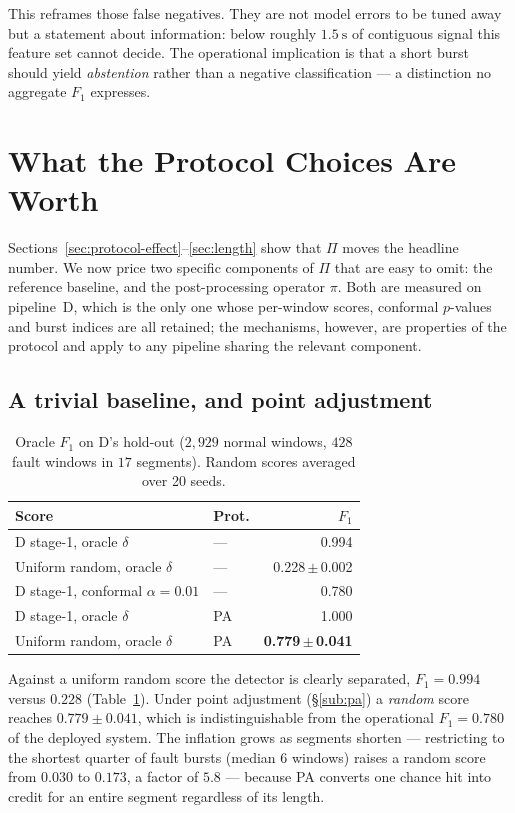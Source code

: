 \documentclass{article}
\begin{document}
This reframes those false negatives. They are not model errors to be tuned
away but a statement about information: below roughly $\SI{1.5}{\second}$ of
contiguous signal this feature set cannot decide. The operational implication
is that a short burst should yield \emph{abstention} rather than a negative
classification --- a distinction no aggregate $F_1$ expresses.

\section{What the Protocol Choices Are Worth}
\label{sec:protoval}

Sections~\ref{sec:protocol-effect}--\ref{sec:length} show that $\Pi$ moves
the headline number. We now price two specific components of $\Pi$ that are
easy to omit: the reference baseline, and the post-processing operator $\pi$.
Both are measured on pipeline~D, which is the only one whose per-window scores,
conformal $p$-values and burst indices are all retained; the mechanisms,
however, are properties of the protocol and apply to any pipeline sharing the
relevant component.

\subsection{A trivial baseline, and point adjustment}

\begin{table}[t]
\caption{Oracle $F_1$ on D's hold-out ($2{,}929$ normal windows, $428$ fault
windows in $17$ segments). Random scores averaged over 20 seeds.}
\label{tab:protoval}
\vskip 0.1in
\centering\small
\setlength{\tabcolsep}{4pt}
\begin{tabular}{@{}llr@{}}
\toprule
Score & Prot. & $F_1$ \\
\midrule
D stage-1, oracle $\delta$ & --- & 0.994 \\
Uniform random, oracle $\delta$ & --- & 0.228\,$\pm$\,0.002 \\
D stage-1, conformal $\alpha{=}0.01$ & --- & 0.780 \\
\midrule
D stage-1, oracle $\delta$ & PA & 1.000 \\
Uniform random, oracle $\delta$ & PA & \textbf{0.779\,$\pm$\,0.041} \\
\bottomrule
\end{tabular}
\end{table}

Against a uniform random score the detector is clearly separated,
$F_1=0.994$ versus $0.228$ (Table~\ref{tab:protoval}). Under point adjustment
(\S\ref{sub:pa}) a \emph{random} score reaches $0.779\pm0.041$, which is
indistinguishable from the operational $F_1=0.780$ of the deployed system. The
inflation grows as segments shorten --- restricting to the shortest quarter of
fault bursts (median 6 windows) raises a random score from $0.030$ to $0.173$,
a factor of $5.8$ --- because PA converts one chance hit into credit for an
entire segment regardless of its length.
\end{document}
